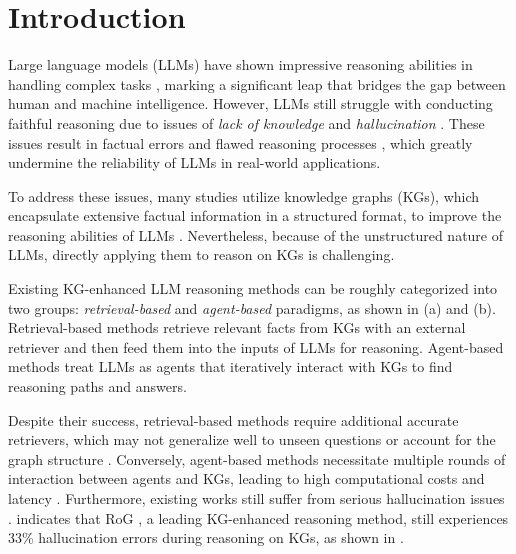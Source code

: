 \section{Introduction}\label{sec:introduction}

Large language models (LLMs) have shown impressive reasoning abilities in handling complex tasks \citep{qiao2023reasoning,huang2023towards}, marking a significant leap that bridges the gap between human and machine intelligence. However, LLMs still struggle with conducting faithful reasoning due to issues of \emph{lack of knowledge} and \emph{hallucination} \citep{huanglarge,wang2023knowledge}. These issues result in factual errors and flawed reasoning processes \citep{nguyen-etal-2024-direct}, which greatly undermine the reliability of LLMs in real-world applications.

To address these issues, many studies utilize knowledge graphs (KGs), which encapsulate extensive factual information in a structured format, to improve the reasoning abilities of LLMs \citep{pan2023unifying,luo2024rog}. Nevertheless, because of the unstructured nature of LLMs, directly applying them to reason on KGs is challenging.

Existing KG-enhanced LLM reasoning methods can be roughly categorized into two groups: \emph{retrieval-based} and \emph{agent-based} paradigms, as shown in  (a) and (b). Retrieval-based methods \citep{li2023graph,yang2024kg,dehghan-etal-2024-ewek} retrieve relevant facts from KGs with an external retriever and then feed them into the inputs of LLMs for reasoning. Agent-based methods \citep{sunthink,zhu2024knowagent,jiang2024kg} treat LLMs as agents that iteratively interact with KGs to find reasoning paths and answers.


Despite their success, retrieval-based methods require additional accurate retrievers, which may not generalize well to unseen questions or account for the graph structure \citep{mavromatis2024gnn}. Conversely, agent-based methods necessitate multiple rounds of interaction between agents and KGs, leading to high computational costs and latency \citep{dehghan-etal-2024-ewek}. Furthermore, existing works still suffer from serious hallucination issues \citep{agrawal2024mindful}. \citet{sui2024fidelis} indicates that RoG \citep{luo2024rog}, a leading KG-enhanced reasoning method, still experiences 33\% hallucination errors during reasoning on KGs, as shown in .


